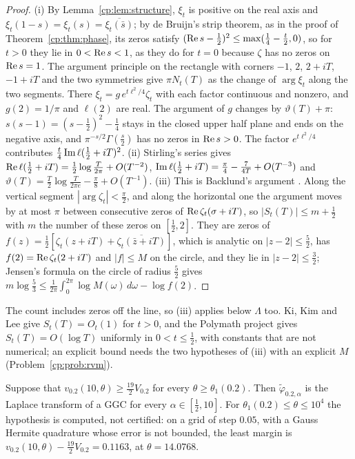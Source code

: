 \begin{proof}
(i) By Lemma~\ref{cp:lem:structure}, $\xi_t$ is positive on the real axis and $\xi_t(1-s)=\xi_t(s)=\overline{\xi_t(\bar s)}$; by de Bruijn's strip theorem, as in the proof of Theorem~\ref{cp:thm:phase}, its zeros satisfy $(\operatorname{Re} s-\frac12)^2\le\max(\frac14-\frac t2,0)$, so for $t>0$ they lie in $0<\operatorname{Re} s<1$, as they do for $t=0$ because $\zeta$ has no zeros on $\operatorname{Re} s=1$. The argument principle on the rectangle with corners $-1$, $2$, $2+iT$, $-1+iT$ and the two symmetries give $\pi N_t(T)$ as the change of $\arg\xi_t$ along the two segments. There $\xi_t=g\,e^{t\ell^2/4}\zeta_t$ with each factor continuous and nonzero, and $g(2)=1/\pi$ and $\ell(2)$ are real. The argument of $g$ changes by $\vartheta(T)+\pi$: $s(s-1)=(s-\frac12)^2-\frac14$ stays in the closed upper half plane and ends on the negative axis, and $\pi^{-s/2}\Gamma(\frac s2)$ has no zeros in $\operatorname{Re} s>0$. The factor $e^{t\ell^2/4}$ contributes $\frac t4\operatorname{Im}\ell(\frac12+iT)^2$. (ii) Stirling's series gives $\operatorname{Re}\ell(\frac12+iT)=\frac12\log\frac T{2\pi}+O(T^{-2})$, $\operatorname{Im}\ell(\frac12+iT)=\frac\pi4-\frac7{4T}+O(T^{-3})$ and $\vartheta(T)=\frac T2\log\frac T{2\pi e}-\frac\pi8+O(T^{-1})$. (iii) This is Backlund's argument \cite{Backlund}. Along the vertical segment $|\arg\zeta_t|<\frac\pi2$, and along the horizontal one the argument moves by at most $\pi$ between consecutive zeros of $\operatorname{Re}\zeta_t(\sigma+iT)$, so $|S_t(T)|\le m+\frac12$ with $m$ the number of these zeros on $[\frac12,2]$. They are zeros of $f(z)=\frac12[\zeta_t(z+iT)+\overline{\zeta_t(\bar z+iT)}]$, which is analytic on $|z-2|\le\frac52$, has $f(2)=\operatorname{Re}\zeta_t(2+iT)$ and $|f|\le M$ on the circle, and they lie in $|z-2|\le\frac32$; Jensen's formula on the circle of radius $\frac52$ gives $m\log\frac53\le\frac1{2\pi}\int_0^{2\pi}\log M(\omega)\,d\omega-\log f(2)$.
\end{proof}

The count includes zeros off the line, so (iii) applies below $\Lambda$ too. Ki, Kim and Lee \cite[Theorem~1.4]{KKL09} give $S_t(T)=O_t(1)$ for $t>0$, and the Polymath project \cite[Theorem~1.5]{Polymath} gives $S_t(T)=O(\log T)$ uniformly in $0<t\le\frac12$, with constants that are not numerical; an explicit bound needs the two hypotheses of (iii) with an explicit $M$ (Problem~\ref{cp:prob:rvm}).

\begin{corollary}\label{cp:cor:minflow}
Suppose that $v_{0.2}(10,\theta)\ge\frac{19}2V_{0.2}$ for every $\theta\ge\theta_1(0.2)$. Then $\tilde\varphi_{0.2,\alpha}$ is the Laplace transform of a GGC for every $\alpha\in[\frac12,10]$. For $\theta_1(0.2)\le\theta\le10^4$ the hypothesis is computed, not certified: on a grid of step $0.05$, with a Gauss Hermite quadrature whose error is not bounded, the least margin is $v_{0.2}(10,\theta)-\frac{19}2V_{0.2}=0.1163$, at $\theta=14.0768$.
\end{corollary}

